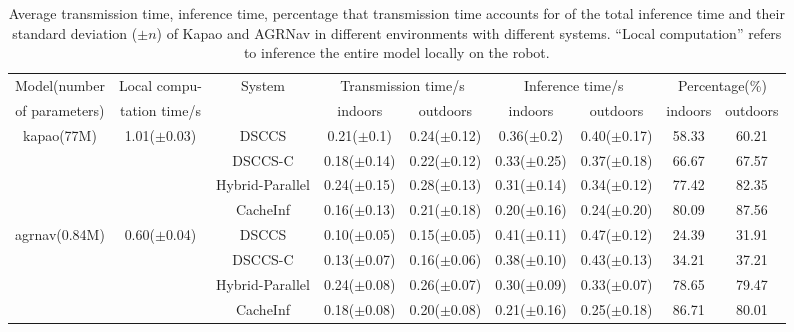 \begin{table}[htb]
    \centering

\begin{tabular}{ccc|c|c|c|c|c|c}
\toprule
Model(number & Local compu- & \multirow[c]{2}{*}{System} & \multicolumn{2}{|c|}{Transmission time/s} & \multicolumn{2}{|c|}{Inference time/s} & \multicolumn{2}{c}{Percentage(\%)} \\
of parameters)& tation time/s &  & indoors & outdoors & indoors & outdoors & indoors & outdoors \\
\midrule
\multirow[c]{4}{*}{kapao(77M)} & \multirow[c]{4}{*}{1.01($\pm$0.03)} & DSCCS & 0.21($\pm$0.1) & 0.24($\pm$0.12) & 0.36($\pm$0.2) & 0.40($\pm$0.17) & 58.33 & 60.21 \\
 &  & DSCCS-C & 0.18($\pm$0.14) & 0.22($\pm$0.12) & 0.33($\pm$0.25) & 0.37($\pm$0.18) & 66.67 & 67.57 \\
 &  & Hybrid-Parallel & 0.24($\pm$0.15) & 0.28($\pm$0.13) & 0.31($\pm$0.14) & 0.34($\pm$0.12) & 77.42 & 82.35 \\
 &  & CacheInf & 0.16($\pm$0.13) & 0.21($\pm$0.18) & 0.20($\pm$0.16) & 0.24($\pm$0.20) & 80.09 & 87.56 \\
\cline{1-9} \cline{2-9}
\multirow[c]{4}{*}{agrnav(0.84M)} & \multirow[c]{4}{*}{0.60($\pm$0.04)} & DSCCS & 0.10($\pm$0.05) & 0.15($\pm$0.05) & 0.41($\pm$0.11) & 0.47($\pm$0.12) & 24.39 & 31.91\\
 &  & DSCCS-C & 0.13($\pm$0.07) & 0.16($\pm$0.06) & 0.38($\pm$0.10) & 0.43($\pm$0.13) & 34.21 & 37.21\\
 &  & Hybrid-Parallel & 0.24($\pm$0.08) & 0.26($\pm$0.07) & 0.30($\pm$0.09) & 0.33($\pm$0.07) & 78.65 & 79.47 \\
 &  & CacheInf & 0.18($\pm$0.08) & 0.20($\pm$0.08) & 0.21($\pm$0.16) & 0.25($\pm$0.18) & 86.71 & 80.01 \\
\cline{1-9} \cline{2-9}
\bottomrule
\end{tabular}


    \caption{Average transmission time, inference time, percentage that transmission time accounts for of the total inference time and their standard deviation ($\pm n$) of Kapao and AGRNav in different environments with different systems. ``Local computation'' refers to inference the entire model locally on the robot.}
    \label{tab:e2e_time}
\end{table}

